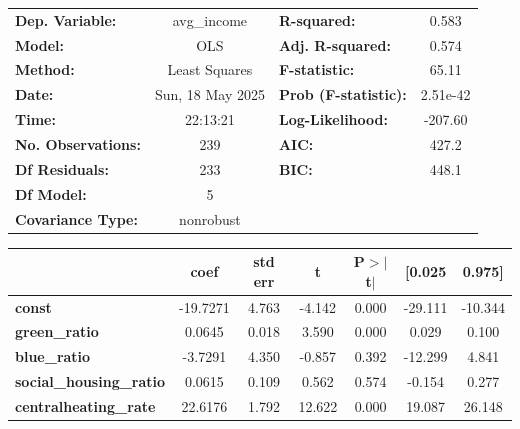 \begin{center}
\begin{tabular}{lclc}
\toprule
\textbf{Dep. Variable:}           &   avg\_income    & \textbf{  R-squared:         } &     0.583   \\
\textbf{Model:}                   &       OLS        & \textbf{  Adj. R-squared:    } &     0.574   \\
\textbf{Method:}                  &  Least Squares   & \textbf{  F-statistic:       } &     65.11   \\
\textbf{Date:}                    & Sun, 18 May 2025 & \textbf{  Prob (F-statistic):} &  2.51e-42   \\
\textbf{Time:}                    &     22:13:21     & \textbf{  Log-Likelihood:    } &   -207.60   \\
\textbf{No. Observations:}        &         239      & \textbf{  AIC:               } &     427.2   \\
\textbf{Df Residuals:}            &         233      & \textbf{  BIC:               } &     448.1   \\
\textbf{Df Model:}                &           5      & \textbf{                     } &             \\
\textbf{Covariance Type:}         &    nonrobust     & \textbf{                     } &             \\
\bottomrule
\end{tabular}
\begin{tabular}{lcccccc}
                                  & \textbf{coef} & \textbf{std err} & \textbf{t} & \textbf{P$> |$t$|$} & \textbf{[0.025} & \textbf{0.975]}  \\
\midrule
\textbf{const}                    &     -19.7271  &        4.763     &    -4.142  &         0.000        &      -29.111    &      -10.344     \\
\textbf{green\_ratio}             &       0.0645  &        0.018     &     3.590  &         0.000        &        0.029    &        0.100     \\
\textbf{blue\_ratio}              &      -3.7291  &        4.350     &    -0.857  &         0.392        &      -12.299    &        4.841     \\
\textbf{social\_housing\_ratio}   &       0.0615  &        0.109     &     0.562  &         0.574        &       -0.154    &        0.277     \\
\textbf{centralheating\_rate}     &      22.6176  &        1.792     &    12.622  &         0.000        &       19.087    &       26.148     \\

\end{tabular}
\end{center}
